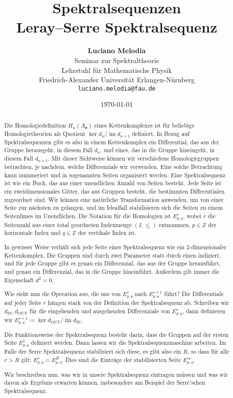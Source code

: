 \documentclass[12pt, hidelinks]{article}
\title{\textbf{Spektralsequenzen\\ Leray–Serre Spektralsequenz}}
\author{
\textbf{Luciano Melodia} \\
Seminar zur Spektraltheorie \\
Lehrstuhl für Mathematische Physik \\
Friedrich-Alexander Universität Erlangen-Nürnberg \\
\texttt{luciano.melodia@fau.de}}
\date{\today}
\numberwithin{conj}{section}
\newcommand{\ima}{\operatorname{im}}
\begin{document}
\hypersetup{bookmarksnumbered=true,}
\maketitle

\begin{abstract}
Die Homologiedefinition $H_n(A_\bullet)$ eines Kettenkomplexes ist für beliebige Homologietheorien als Quotient $\ker d_n/\ima d_{n+1}$ definiert. In Bezug auf Spektralsequenzen gibt es also in einem Kettenkomplex ein Differential, das aus der Gruppe herausgeht, in diesem Fall $d_n$, und eines, das in die Gruppe hineingeht, in diesem Fall $d_{n+1}$. Mit dieser Sichtweise können wir verschiedene Homologiegruppen betrachten, je nachdem, welche Differenziale wir verwenden. Eine solche Betrachtung kann nummeriert und in sogenannten Seiten organisiert werden. Eine Spektralsequenz ist wie ein Buch, das aus einer unendlichen Anzahl von Seiten besteht. Jede Seite ist ein zweidimensionales Gitter, das aus Gruppen besteht, die bestimmten Differentialen zugeordnet sind. Wir können eine natürliche Transformation anwenden, um von einer Seite zur nächsten zu gelangen, und im Idealfall stabilisieren sich die Seiten zu einem Seitenlimes im Unendlichen. Die Notation für die Homologien ist $E^r_{p,q}$, wobei $r$ die Seitenzahl aus einer total geordneten Indexmenge $(I,\leq)$ entnommen, $p \in \mathbb{Z}$ der horizontale Index und $q \in \mathbb{Z}$ der vertikale Index ist.

In gewisser Weise verhält sich jede Seite einer Spektralsequenz wie ein $2$-dimensionaler Kettenkomplex. Die Gruppen sind durch zwei Parameter statt durch einen indiziert, und für jede Gruppe gibt es genau ein Differenzial, das aus der Gruppe herausführt, und genau ein Differenzial, das in die Gruppe hineinführt. Außerdem gilt immer die Eigenschaft $d^2 = 0$.

Wie sieht nun die Operation aus, die uns von $E^r_{p,q}$ nach $E^{r+1}_{p,q}$ führt? Die Differentiale auf jeder Seite $r$ hängen stark von der Definition der Spektralsequenz ab. Schreiben wir $d_{\operatorname{IN}},d_{\operatorname{OUT}}$ für die eingehenden und ausgehenden Differenziale von $E^r_{p,q}$, dann definieren wir $E^{r+1}_{p,q} \coloneq \ker d_{\operatorname{OUT}} / \ima d_{\operatorname{IN}}$.

Die Funktionsweise der Spektralsequenz besteht darin, dass die Gruppen auf der ersten Seite $E^1_{p,q}$ definiert werden. Dann lassen wir die Spektralsequenzmaschine arbeiten. Im Falle der Serre Spektralsequenz stabilisiert sich diese, es gibt also ein $R$, so dass für alle $r > R$ gilt: $E^r_{p,q} = E^R_{p,q}$. Dies sind die Einträge der stabilisierten Seite $E^\infty_{p,q}$.

Wir beschreiben nun, was wir in unsere Spektralsequenz eintragen müssen und was wir davon als Ergebnis erwarten können, insbesondere am Beispiel der Serre'schen Spektralsequenz.
\end{abstract}
\end{document}
